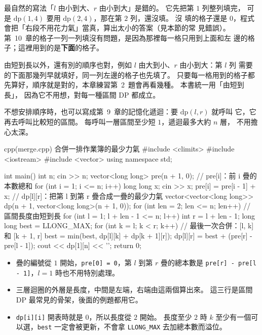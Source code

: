 最自然的寫法「$l$ 由小到大、$r$ 由小到大」是錯的。 它先把第 $1$ 列整列填完，
可是 $\mathrm{dp}(1, 4)$ 要用 $\mathrm{dp}(2, 4)$，那在第 $2$ 列，還沒填。 沒
填的格子還是 $0$，程式會把「右段不用花力氣」當真，算出太小的答案（見本節的常
見錯誤）。 第~10~章的格子一列一列填沒有問題，是因為那裡每一格只用到上面和左
邊的格子；這裡用到的是\textbf{下面}的格子。

由短到長以外，還有別的順序也對，例如 $l$ 由大到小、$r$ 由小到大：第 $l$ 列
需要的下面那幾列早就填好，同一列左邊的格子也先填了。 只要每一格用到的格子都
先算好，順序就是對的，本章練習第~2~題會再看幾種。 本書統一用「由短到長」，
因為它不用想，對每一種區間 DP 都成立。

不想安排順序時，也可以寫成第~9~章的記憶化遞迴：要 $\mathrm{dp}(l, r)$ 就呼叫
它，它再去呼叫比較短的區間。 每呼叫一層區間至少短 $1$，遞迴最多大約 $n$ 層，
不用擔心太深。

\begin{example}[label=ex:ivdp-merge]{cpp}{(merge.cpp) 合併一排作業簿的最少力氣}
#include <climits>
#include <iostream>
#include <vector>
using namespace std;

int main() {
    int n;
    cin >> n;
    vector<long long> pre(n + 1, 0);          // pre[i]：前 i 疊的本數總和
    for (int i = 1; i <= n; i++) {
        long long x;
        cin >> x;
        pre[i] = pre[i - 1] + x;
    }
    // dp[l][r]：把第 l 到第 r 疊合成一疊的最少力氣
    vector<vector<long long>> dp(n + 1, vector<long long>(n + 1, 0));
    for (int len = 2; len <= n; len++) {      // 區間長度由短到長
        for (int l = 1; l + len - 1 <= n; l++) {
            int r = l + len - 1;
            long long best = LLONG_MAX;
            for (int k = l; k < r; k++) {     // 最後一次合併：[l, k] 和 [k + 1, r]
                best = min(best, dp[l][k] + dp[k + 1][r]);
            }
            dp[l][r] = best + (pre[r] - pre[l - 1]);
        }
    }
    cout << dp[1][n] << '\n';
    return 0;
}
\end{example}


\begin{itemize}
\item 疊的編號從 $1$ 開始，\texttt{pre[0] = 0}，第 $l$ 到第 $r$ 疊的總本數是
\texttt{pre[r] - pre[l - 1]}，$l = 1$ 時也不用特別處理。
\item 三層迴圈的外層是長度，中間是左端，右端由這兩個算出來。 這三行是區間 DP
最常見的骨架，後面的例題都用它。
\item \texttt{dp[i][i]} 開表時就是 $0$，所以長度從 $2$ 開始。 長度至少 $2$ 時
$k$ 至少有一個可以選，\texttt{best} 一定會被更新，不會拿 \texttt{LLONG\_MAX}
去加總本數而溢位。
\end{itemize}

